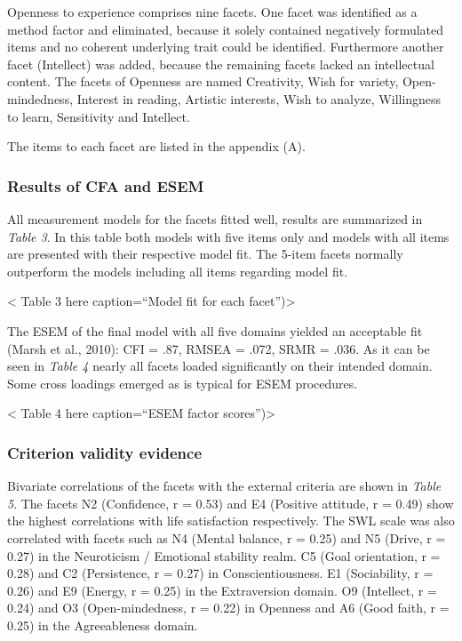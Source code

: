 \documentclass[,man,floatsintext]{apa6}
\theoremstyle{definition}
\theoremstyle{definition}
\theoremstyle{definition}
\theoremstyle{remark}
\begin{document}
Openness to experience comprises nine facets. One facet was identified
as a method factor and eliminated, because it solely contained
negatively formulated items and no coherent underlying trait could be
identified. Furthermore another facet (Intellect) was added, because the
remaining facets lacked an intellectual content. The facets of Openness
are named Creativity, Wish for variety, Open-mindedness, Interest in
reading, Artistic interests, Wish to analyze, Willingness to learn,
Sensitivity and Intellect.

The items to each facet are listed in the appendix (A).

\hypertarget{results-of-cfa-and-esem}{%
\subsubsection{Results of CFA and ESEM}\label{results-of-cfa-and-esem}}

All measurement models for the facets fitted well, results are
summarized in \emph{Table 3}. In this table both models with five items
only and models with all items are presented with their respective model
fit. The 5-item facets normally outperform the models including all
items regarding model fit.

\vspace{5mm}

\textless{} Table 3 here caption=\enquote{Model fit for each
facet})\textgreater{}

\vspace{5mm}

The ESEM of the final model with all five domains yielded an acceptable
fit (Marsh et al., 2010): CFI = .87, RMSEA = .072, SRMR = .036. As it
can be seen in \emph{Table 4} nearly all facets loaded significantly on
their intended domain. Some cross loadings emerged as is typical for
ESEM procedures.

\vspace{5mm}

\textless{} Table 4 here caption=\enquote{ESEM factor
scores})\textgreater{}

\vspace{5mm}

\hypertarget{criterion-validity-evidence-1}{%
\subsubsection{Criterion validity
evidence}\label{criterion-validity-evidence-1}}

Bivariate correlations of the facets with the external criteria are
shown in \emph{Table 5}. The facets N2 (Confidence, r = 0.53) and E4
(Positive attitude, r = 0.49) show the highest correlations with life
satisfaction respectively. The SWL scale was also correlated with facets
such as N4 (Mental balance, r = 0.25) and N5 (Drive, r = 0.27) in the
Neuroticism / Emotional stability realm. C5 (Goal orientation, r = 0.28)
and C2 (Persistence, r = 0.27) in Conscientiousness. E1 (Sociability, r
= 0.26) and E9 (Energy, r = 0.25) in the Extraversion domain. O9
(Intellect, r = 0.24) and O3 (Open-mindedness, r = 0.22) in Openness and
A6 (Good faith, r = 0.25) in the Agreeableness domain.
\end{document}
